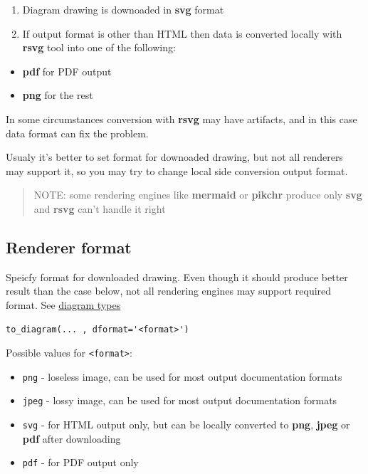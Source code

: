 \documentclass[
  12pt,
  a4paper,
  12pt,
  oneside,
  openany]{book}
\providecommand{\tightlist}{%
  \setlength{\itemsep}{0pt}\setlength{\parskip}{0pt}}
\begin{document}
\begin{enumerate}
\tightlist
\item
  Diagram drawing is downoaded in \textbf{svg} format
\item
  If output format is other than HTML then data is converted locally with \textbf{rsvg} tool into one of the following:
\end{enumerate}

\begin{itemize}
\tightlist
\item
  \textbf{pdf} for PDF output
\item
  \textbf{png} for the rest
\end{itemize}

In some circumstances conversion with \textbf{rsvg} may have artifacts, and in this case data format can fix the problem.

Usualy it's better to set format for downoaded drawing, but not all renderers may support it, so you may try to change local side conversion output format.

\begin{quote}
NOTE: some rendering engines like \textbf{mermaid} or \textbf{pikchr} produce only \textbf{svg} and \textbf{rsvg} can't handle it right
\end{quote}

\hypertarget{usage-format-renderer}{%
\subsection{Renderer format}\label{usage-format-renderer}}

Speicfy format for downloaded drawing. Even though it should produce better result than the case below, not all rendering engines may support required format. See \href{https://kroki.io/\#support}{diagram types}

\begin{verbatim}
to_diagram(... , dformat='<format>')
\end{verbatim}

Possible values for \texttt{\textless{}format\textgreater{}}:

\begin{itemize}
\tightlist
\item
  \texttt{png} - loseless image, can be used for most output documentation formats
\item
  \texttt{jpeg} - lossy image, can be used for most output documentation formats
\item
  \texttt{svg} - for HTML output only, but can be locally converted to \textbf{png}, \textbf{jpeg} or \textbf{pdf} after downloading
\item
  \texttt{pdf} - for PDF output only
\end{itemize}
\end{document}
